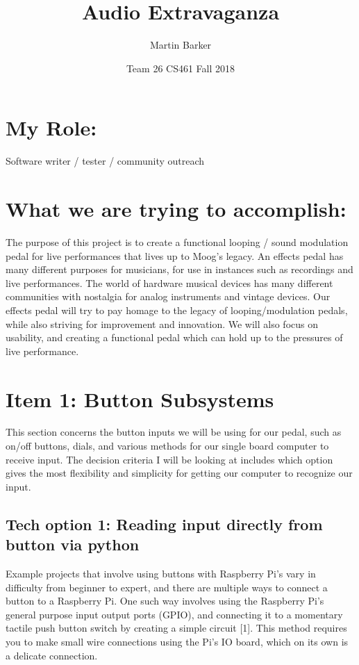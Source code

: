 \documentclass{article}
\title{Audio Extravaganza}
\author{Martin Barker}
\date{Team 26 CS461 Fall 2018}
\begin{document}
\maketitle

\section{My Role:}
Software writer / tester / community outreach


\section{What we are trying to accomplish:}
The purpose of this project is to create a functional looping / sound modulation pedal for live performances that lives up to Moog’s legacy. An effects pedal has many different purposes for musicians, for use in instances such as recordings and live performances. The world of hardware musical devices has many different communities with nostalgia for analog instruments and vintage devices. Our effects pedal will try to pay homage to the legacy of looping/modulation pedals, while also striving for improvement and innovation. We will also focus on usability, and creating a functional pedal which can hold up to the pressures of live performance. 

\section{Item 1: Button Subsystems}
This section concerns the button inputs we will be using for our pedal, such as on/off buttons, dials, and various methods for our single board computer to receive input. The decision criteria I will be looking at includes which option gives the most flexibility and simplicity for getting our computer to recognize our input. 

\subsection{Tech option 1: Reading input directly from button via  python}

Example projects that involve using buttons with Raspberry Pi's vary in difficulty from beginner to expert, and there are multiple ways to connect a button to a Raspberry Pi. One such way involves using the Raspberry Pi's general purpose input output ports (GPIO), and connecting it to a momentary tactile push button switch by creating a simple circuit [1]. This method requires you to make small wire connections using the Pi's IO board, which on its own is a delicate connection. 
\end{document}
